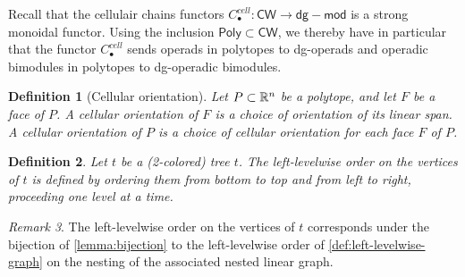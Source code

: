 \documentclass[twoside, 12pt]{amsart}
\newtheorem{definition}{Definition}[section]
\theoremstyle{remark}
\newtheorem{remark}[definition]{\sc Remark}
\begin{document}
Recall that the cellulair chains functors $C_\bullet^{cell} : \mathsf{CW} \rightarrow \mathsf{dg-mod}$ is a strong monoidal functor. Using the inclusion $\mathsf{Poly} \subset \mathsf{CW}$, we thereby have in particular that the functor $C_\bullet^{cell}$ sends operads in polytopes to dg-operads and operadic bimodules in polytopes to dg-operadic bimodules.

\begin{definition}[Cellular orientation] 
\leavevmode
Let $P\subset\mathbb{R}^n$ be a polytope, and let $F$ be a face of $P$. A \emph{cellular orientation of $F$} is a choice of orientation of its linear span. A \emph{cellular orientation of $P$} is a choice of cellular orientation for each face $F$ of $P$. 
\end{definition}

\begin{definition} \label{def:left-levelwise-tree}
Let $t$ be a (2-colored) tree $t$. The \emph{left-levelwise order} on the vertices of $t$ is defined by ordering them from bottom to top and from left to right, proceeding one level at a time.
\end{definition}

\begin{remark}
The left-levelwise order on the vertices of $t$ corresponds under the bijection of \cref{lemma:bijection} to the left-levelwise order of \cref{def:left-levelwise-graph} on the nesting of the associated nested linear graph.
\end{remark}

\end{document}
